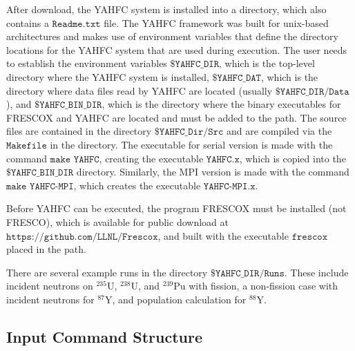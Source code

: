 \documentclass[
10pt,
showpacs,preprintnumbers,footinbib,
amsfonts,amsmath,amssymb,
aps,
prc,twocolumn,groupedaddress,superscriptaddress,
showkeys,
nofootinbib
]{revtex4-1}
\begin{document}
After download, the YAHFC system is installed into a directory, which also contains a ${\texttt{Readme.txt}}$ file.
The YAHFC framework was built for unix-based architectures and makes use of environment variables that define the directory locations for the YAHFC system that are used during execution. The user needs to establish the environment variables ${\texttt{\$YAHFC\_DIR}}$, which is the top-level directory where the YAHFC system is installed, ${\texttt{\$YAHFC\_DAT}}$, which is the directory where data files read by YAHFC are located (usually ${\texttt{\$YAHFC\_DIR/Data}}$), and ${\texttt{\$YAHFC\_BIN\_DIR}}$, which is the directory where the binary executables for FRESCOX and YAHFC are located and must be added to the path. The source files are contained in the directory ${\texttt{\$YAHFC\_Dir/Src}}$ and are compiled via the ${\texttt{Makefile}}$ in the directory. The executable for serial version is made with the command ${\texttt{make YAHFC}}$, creating the executable ${\texttt{YAHFC.x}}$, which is copied into the 
${\texttt{\$YAHFC\_BIN\_DIR}}$ directory. Similarly, the MPI version is made with the command ${\texttt{make YAHFC-MPI}}$, which creates the executable ${\texttt{YAHFC-MPI.x}}$.

Before YAHFC can be executed, the program FRESCOX must be installed (not FRESCO), which is available for public download at ${\texttt{https://github.com/LLNL/Frescox}}$, and built with the executable ${\texttt{frescox}}$ placed in the path.

There are several example runs in the directory ${\texttt{\$YAHFC\_DIR/Runs}}$. These include incident neutrons on $^{235}$U, $^{238}$U, and $^{239}$Pu with fission, a non-fission case with incident neutrons for $^{87}$Y, and population calculation for $^{88}$Y. 

\subsection{Input Command Structure}
\end{document}
